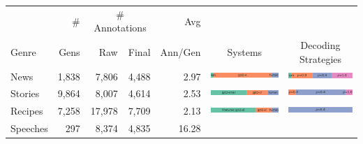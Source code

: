 \begin{table}[tb]
\center
\small
\begin{tabular}{l|r|rr|r|c|c}
\toprule
 & \# & \multicolumn{2}{|c|}{\# Annotations} & {Avg} & & \\
Genre & Gens & Raw & Final & Ann/Gen & Systems & Decoding Strategies \\
\midrule
News & 1,838 & 7,806 & 4,488 & 2.97 &
\begin{minipage}{.275\textwidth}
      \includegraphics[height=1em]{figures/model_dist_new_york_times}
\end{minipage}
&
\begin{minipage}{.225\textwidth}
      \includegraphics[height=1em]{figures/decoding_dist_new_york_times}
\end{minipage}
\\
Stories & 9,864 & 8,007 & 4,614 & 2.53 &
\begin{minipage}{.275\textwidth}
      \includegraphics[height=1em]{figures/model_dist_short_stories}
\end{minipage}
&
\begin{minipage}{.225\textwidth}
      \includegraphics[height=1em]{figures/decoding_dist_short_stories}
\end{minipage}
\\
Recipes & 7,258 & 17,978 & 7,709 & 2.13 &
\begin{minipage}{.275\textwidth}
      \includegraphics[height=1em]{figures/model_dist_recipes}
\end{minipage}
&
\begin{minipage}{.225\textwidth}
      \includegraphics[height=1em]{figures/decoding_dist_recipes}
\end{minipage}
\\
Speeches & 297 & 8,374 & 4,835 & 16.28 &
\begin{minipage}{.275\textwidth}

\end{minipage}
\end{tabular}
\end{table}
